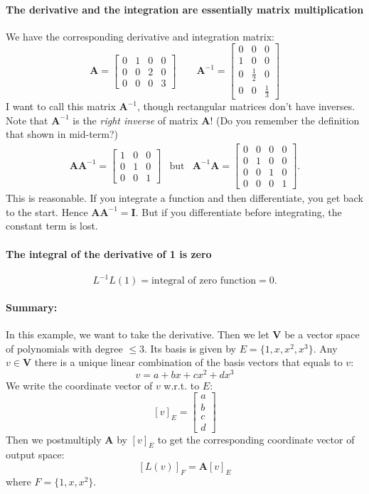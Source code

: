 \paragraph{The derivative and the integration are essentially matrix multiplication}
We have the corresponding derivative and integration matrix:
\[
\bm A=\begin{bmatrix}
0&1&0&0\\0&0&2&0\\0&0&0&3
\end{bmatrix}\qquad\bm A^{-1}=\begin{bmatrix}
0&0&0\\1&0&0\\0&\frac{1}{2}&0\\0&0&\frac{1}{3}
\end{bmatrix}
\]
I want to call this matrix $\bm A^{-1}$, though rectangular matrices don't have inverses. Note that $\bm A^{-1}$ is the \emph{right inverse} of matrix $\bm A$! (Do you remember the definition that shown in mid-term?)
\[
\begin{array}{lll}
\bm A\bm A^{-1}=\begin{bmatrix}
1&0&0\\0&1&0\\0&0&1
\end{bmatrix}
&
\mbox{but}
&
\bm A^{-1}\bm A=\begin{bmatrix}
0&0&0&0\\0&1&0&0\\0&0&1&0\\0&0&0&1
\end{bmatrix}.
\end{array}
\]
This is reasonable. If you integrate a function and then differentiate, you get back to the start. Hence $\bm A\bm A^{-1}=\bm I$. But if you differentiate before integrating, the constant term is lost.

\paragraph{The integral of the derivative of 1 is zero}
\[
L^{-1}L(1)=\text{integral of zero function}=0.
\]
\paragraph{Summary:}
In this example, we want to take the derivative. Then we let $\bm V$ be a vector space of polynomials with degree $\le 3$. Its basis is given by $E=\{1,x,x^2,x^3\}$. Any $v\in\bm V$ there is a unique linear combination of the basis vectors that equals to $v$:
\[
v=a+bx+cx^2+dx^3
\]
We write the coordinate vector of $v$ w.r.t. to $E$:
\[
[v]_{E}=\begin{bmatrix}
a\\b\\c\\d
\end{bmatrix}
\]
Then we postmultiply $\bm A$ by $[v]_{E}$ to get the corresponding coordinate vector of output space:
\[
[L(v)]_{F}=\bm A[v]_{E}
\]
where $F=\{1,x,x^2\}$.

